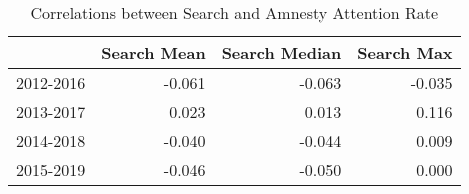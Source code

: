 \begin{table}[ht]
\centering
\begin{tabular}{|l|rrr|}
  \hline
 & Search Mean & Search Median & Search Max \\ 
  \hline
2012-2016 & -0.061 & -0.063 & -0.035 \\ 
  2013-2017 & 0.023 & 0.013 & 0.116 \\ 
  2014-2018 & -0.040 & -0.044 & 0.009 \\ 
  2015-2019 & -0.046 & -0.050 & 0.000 \\ 
   \hline
\end{tabular}
\caption{Correlations between Search and Amnesty Attention Rate} 
\end{table}
